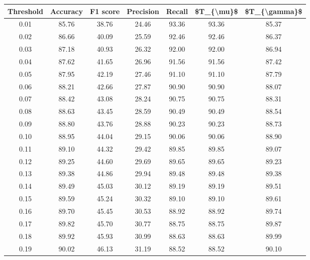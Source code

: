 \begin{tabular}{|c|c|c|c|c|c|c|}
\hline
 Threshold &  Accuracy &  F1 score &  Precision &  Recall &  \$T\_\{\textbackslash mu\}\$ &  \$T\_\{\textbackslash gamma\}\$ \\
\hline
      0.01 &     85.76 &     38.76 &      24.46 &   93.36 &      93.36 &         85.37 \\
      0.02 &     86.66 &     40.09 &      25.59 &   92.46 &      92.46 &         86.37 \\
      0.03 &     87.18 &     40.93 &      26.32 &   92.00 &      92.00 &         86.94 \\
      0.04 &     87.62 &     41.65 &      26.96 &   91.56 &      91.56 &         87.42 \\
      0.05 &     87.95 &     42.19 &      27.46 &   91.10 &      91.10 &         87.79 \\
      0.06 &     88.21 &     42.66 &      27.87 &   90.90 &      90.90 &         88.07 \\
      0.07 &     88.42 &     43.08 &      28.24 &   90.75 &      90.75 &         88.31 \\
      0.08 &     88.63 &     43.45 &      28.59 &   90.49 &      90.49 &         88.54 \\
      0.09 &     88.80 &     43.76 &      28.88 &   90.23 &      90.23 &         88.73 \\
      0.10 &     88.95 &     44.04 &      29.15 &   90.06 &      90.06 &         88.90 \\
      0.11 &     89.10 &     44.32 &      29.42 &   89.85 &      89.85 &         89.07 \\
      0.12 &     89.25 &     44.60 &      29.69 &   89.65 &      89.65 &         89.23 \\
      0.13 &     89.38 &     44.86 &      29.94 &   89.48 &      89.48 &         89.38 \\
      0.14 &     89.49 &     45.03 &      30.12 &   89.19 &      89.19 &         89.51 \\
      0.15 &     89.59 &     45.24 &      30.32 &   89.10 &      89.10 &         89.61 \\
      0.16 &     89.70 &     45.45 &      30.53 &   88.92 &      88.92 &         89.74 \\
      0.17 &     89.82 &     45.70 &      30.77 &   88.75 &      88.75 &         89.87 \\
      0.18 &     89.92 &     45.93 &      30.99 &   88.63 &      88.63 &         89.99 \\
      0.19 &     90.02 &     46.13 &      31.19 &   88.52 &      88.52 &         90.10 \\

\end{tabular}

